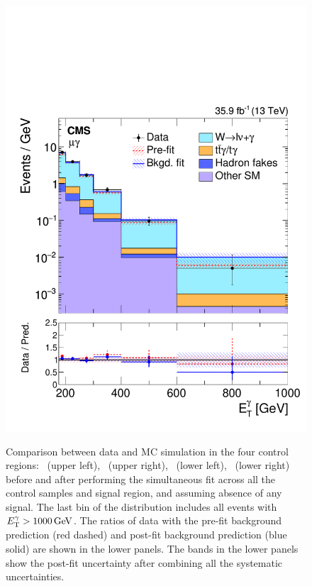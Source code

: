 \begin{figure}[htbp]
{    \includegraphics[]{Analysis/Figures/results/bonly_monomu.pdf}
  }
    \caption{
      Comparison between data and MC simulation in the four control regions: 
      \Pe\Pe\Pgg\ (upper left), 
      \Pgm\Pgm\Pgg\ (upper right), 
      \Pe\Pgg\ (lower left), 
      \Pgm\Pgg\ (lower right) 
      before and after performing the simultaneous fit across all the control samples and signal region, and assuming absence of any signal.
      The last bin of the distribution includes all events with $E_{\mathrm{T}}^{\gamma} > 1000\,\text{Ge\hspace{-.08em}V}$. 
      The ratios of data with the pre-fit background prediction (red dashed) and post-fit background prediction (blue solid) are shown in the lower panels. 
      The bands in the lower panels show the post-fit uncertainty after combining all the systematic uncertainties.
}
    \label{fig:postfitCR}
\end{figure}
